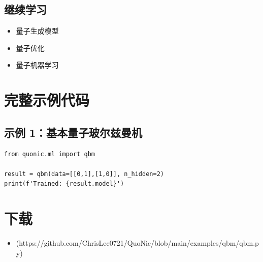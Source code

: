 \documentclass[12pt,a4paper]{article}
\begin{document}
\subsection{继续学习}
\begin{itemize}
  \item 量子生成模型
  \item 量子优化
  \item 量子机器学习
\end{itemize}

\section{完整示例代码}

\subsection{示例 1：基本量子玻尔兹曼机}

\begin{verbatim}
from quonic.ml import qbm

result = qbm(data=[[0,1],[1,0]], n_hidden=2)
print(f'Trained: {result.model}')
\end{verbatim}

\section{下载}

\begin{itemize}
  \item [qbm.py](https://github.com/ChrisLee0721/QuoNic/blob/main/examples/qbm/qbm.py)
\end{itemize}
\end{document}
